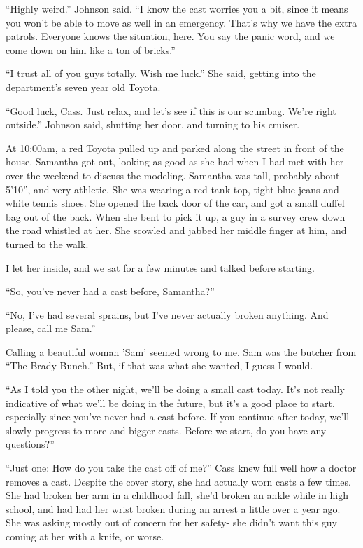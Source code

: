 ``Highly weird.'' Johnson said. ``I know the cast worries you a bit, since it means you
won't be able to move as well in an emergency. That's why we have the extra patrols. Everyone
knows the situation, here. You say the panic word, and we come down on him like a ton of
bricks.''

``I trust all of you guys totally. Wish me luck.'' She said, getting into the department's
seven year old Toyota.

``Good luck, Cass. Just relax, and let's see if this is our scumbag. We're right
outside.'' Johnson said, shutting her door, and turning to his cruiser.

At 10:00am, a red Toyota pulled up and parked along the street in front of the house.
Samantha got out, looking as good as she had when I had met with her over the weekend to discuss
the modeling. Samantha was tall, probably about 5'10'', and very athletic. She was wearing a red
tank top, tight blue jeans and white tennis shoes. She opened the back door of the car, and got
a small duffel bag out of the back. When she bent to pick it up, a guy in a survey crew down the
road whistled at her. She scowled and jabbed her middle finger at him, and turned to the walk.

I let her inside, and we sat for a few minutes and talked before starting.

``So, you've never had a cast before, Samantha?''

``No, I've had several sprains, but I've never actually broken anything. And please, call
me Sam.''

Calling a beautiful woman 'Sam' seemed wrong to me. Sam was the butcher from ``The Brady
Bunch.'' But, if that was what she wanted, I guess I would.

``As I told you the other night, we'll be doing a small cast today. It's not really
indicative of what we'll be doing in the future, but it's a good place to start, especially
since you've never had a cast before. If you continue after today, we'll slowly progress to more
and bigger casts. Before we start, do you have any questions?''

``Just one: How do you take the cast off of me?'' Cass knew full well how a doctor removes
a cast. Despite the cover story, she had actually worn casts a few times. She had broken her arm
in a childhood fall, she'd broken an ankle while in high school, and had had her wrist broken
during an arrest a little over a year ago. She was asking mostly out of concern for her safety-
she didn't want this guy coming at her with a knife, or worse.

